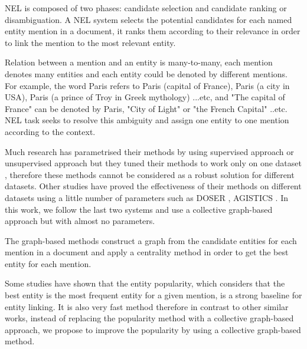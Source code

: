 \documentclass{llncs}
\begin{document}
NEL  is composed of two phases: candidate selection and candidate ranking or disambiguation. A NEL system selects the potential candidates for each named entity mention in a document,  it ranks them according to their relevance in order to link the mention to the most relevant entity. 

Relation between a mention and an entity is many-to-many, each mention denotes many entities and each entity could be denoted by different mentions. For example, the word Paris refers to Paris (capital of France), Paris (a city in USA), Paris (a  prince of Troy in Greek mythology) ...etc, and "The capital of France" can be denoted by Paris, "City of Light" or  "the French Capital" ..etc. NEL task seeks to resolve this ambiguity and assign one entity to one mention according to the context. 

Much  research has parametrised their methods by using supervised approach \cite{hoffart_robust_2011,durrett_joint_2014,ganea_probabilistic_2016,francis-landau_capturing_2016} or unsupervised approach but they  tuned their methods to work only on one dataset \cite{pershina_personalized_2015,alhelbawy_graph_2014}, therefore these methods cannot be considered as a robust solution for different datasets. Other studies have proved the effectiveness of their methods on different datasets using a little number of parameters such as DOSER \cite{zwicklbauer_doser_2016}, AGISTICS \cite{usbeck_agdistis_2014}. In this work, we follow the last two systems and use a collective graph-based approach but with almost no parameters. 

The graph-based methods construct a graph from the candidate entities for each mention in a document and apply a centrality method  in order to get the best entity for each mention.


Some studies have shown that the entity popularity, which considers that the best entity is the most frequent entity for a given mention, is a strong baseline for entity linking\cite{hachey_evaluating_2013,cheng_relational_2013}. It is also very fast method therefore in contrast to other similar works, instead of replacing the popularity method with a collective graph-based approach, we propose to improve the popularity by using a collective graph-based method. 
\end{document}
